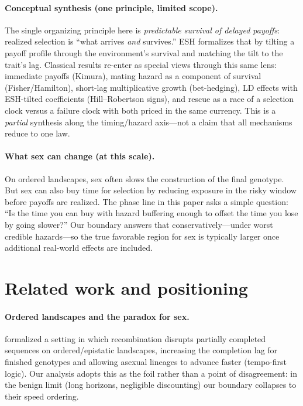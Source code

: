 \documentclass[11pt]{article}
\theoremstyle{upright}
\begin{document}
\paragraph{Conceptual synthesis (one principle, limited scope).}
The single organizing principle here is \emph{predictable survival of delayed payoffs}: realized selection is “what arrives \emph{and} survives.” ESH formalizes that by tilting a payoff profile through the environment’s survival and matching the tilt to the trait’s lag. Classical results re-enter as special views through this same lens: immediate payoffs (Kimura), mating hazard as a component of survival (Fisher/Hamilton), short-lag multiplicative growth (bet-hedging), LD effects with ESH-tilted coefficients (Hill–Robertson signs), and rescue as a race of a selection clock versus a failure clock with both priced in the same currency. This is a \emph{partial} synthesis along the timing/hazard axis—not a claim that all mechanisms reduce to one law.

\paragraph{What sex can change (at this scale).}
On ordered landscapes, sex often slows the construction of the final genotype. But sex can also buy time for selection by reducing exposure in the risky window before payoffs are realized. The phase line in this paper asks a simple question: “Is the time you can buy with hazard buffering enough to offset the time you lose by going slower?” Our boundary answers that conservatively—under worst credible hazards—so the true favorable region for sex is typically larger once additional real-world effects are included.

\section{Related work and positioning}\label{sec:related}

\paragraph{Ordered landscapes and the paradox for sex.}
\citet{Kondrashov2001} formalized a setting in which recombination disrupts partially completed sequences on ordered/epistatic landscapes, increasing the completion lag for finished genotypes and allowing asexual lineages to advance faster (tempo-first logic). Our analysis adopts this as the foil rather than a point of disagreement: in the benign limit (long horizons, negligible discounting) our boundary collapses to their speed ordering.
\end{document}
